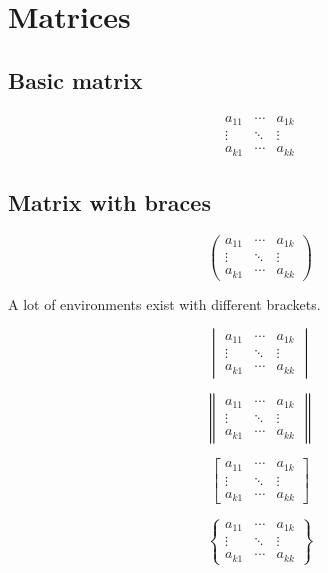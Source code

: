 \documentclass{article}
\begin{document}
\section*{Matrices}

\subsection*{Basic matrix}

\[
\begin{matrix}
	a_{11} & \cdots & a_{1k}\\
	\vdots & \ddots & \vdots\\
	a_{k1} & \cdots & a_{kk}
\end{matrix}
\]

\subsection*{Matrix with braces}

\[
\begin{pmatrix}
	a_{11} & \cdots & a_{1k}\\
	\vdots & \ddots & \vdots\\
	a_{k1} & \cdots & a_{kk}
\end{pmatrix}
\]

A lot of environments exist with different brackets.

\[
\begin{vmatrix}
	a_{11} & \cdots & a_{1k}\\
	\vdots & \ddots & \vdots\\
	a_{k1} & \cdots & a_{kk}
\end{vmatrix}
\]

\[
\begin{Vmatrix}
	a_{11} & \cdots & a_{1k}\\
	\vdots & \ddots & \vdots\\
	a_{k1} & \cdots & a_{kk}
\end{Vmatrix}
\]

\[
\begin{bmatrix}
	a_{11} & \cdots & a_{1k}\\
	\vdots & \ddots & \vdots\\
	a_{k1} & \cdots & a_{kk}
\end{bmatrix}
\]

\[
\begin{Bmatrix}
	a_{11} & \cdots & a_{1k}\\
	\vdots & \ddots & \vdots\\
	a_{k1} & \cdots & a_{kk}
\end{Bmatrix}
\]
\end{document}

